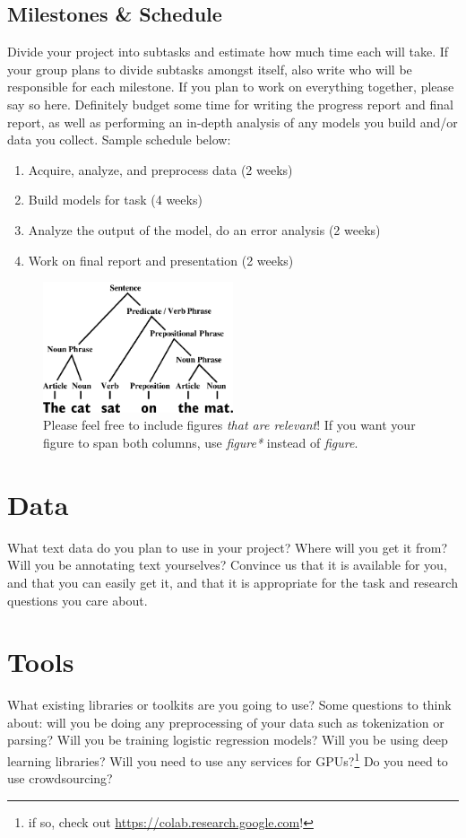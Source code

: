 \documentclass[11pt,a4paper]{article}
\begin{document}
\subsection{Milestones \& Schedule}
Divide your project into subtasks and estimate how much time each will take. If your group plans to divide subtasks amongst itself, also write who will be responsible for each milestone. If you plan to work on everything together, please say so here. Definitely budget some time for writing the progress report and final report, as well as performing an in-depth analysis of any models you build and/or data you collect. Sample schedule below:
\begin{enumerate}
    \item Acquire, analyze, and preprocess data (2 weeks)
    \item Build models for task (4 weeks)
    \item Analyze the output of the model, do an error analysis (2 weeks)
    \item Work on final report and presentation (2 weeks)
\end{enumerate}

\begin{figure}[t]
    \centering
    \includegraphics[width=0.5\textwidth]{figs/sentence.png}
    \caption{Please feel free to include figures \emph{that are relevant}! If you want your figure to span both columns, use \emph{figure*} instead of \emph{figure}.}
    \label{fig:example}
\end{figure}

\section{Data}
What text data do you plan to use in your project? Where will you get it from? Will you be annotating text yourselves? Convince us that it is available for you, and that you can easily get it, and that it is appropriate for the task and research questions you care about.

\section{Tools}
What existing libraries or toolkits are you going to use? Some questions to think about: will you be doing any preprocessing of your data such as tokenization or parsing? Will you be training logistic regression models? Will you be using deep learning libraries? Will you need to use any services for GPUs?\footnote{if so, check out \url{https://colab.research.google.com}!} Do you need to use crowdsourcing?


\footnotesize

\end{document}
